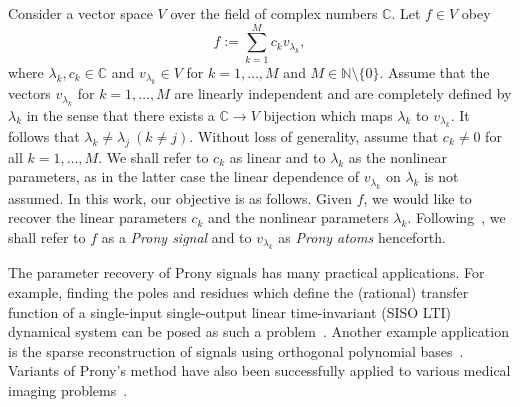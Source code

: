 \documentclass{arxiv}
\begin{document}
Consider a vector space $V$ over the field of complex numbers $\mathbb{C}$. Let $f \in V$ obey
\begin{equation}
    \label{eq:PronySig}
    f := \sum_{k=1}^M c_k v_{\lambda_k},
\end{equation}
where $\lambda_k, c_k \in \mathbb{C}$ and  $v_{\lambda_k} \in V$ for $k=1,\ldots,M$ and $M \in \mathbb{N} \setminus \{0\}$. Assume that the vectors $v_{\lambda_k}$ for $k=1,\ldots,M$ are linearly independent and are completely defined by $\lambda_k$ in the sense that there exists a $\mathbb{C} \to V$  bijection which maps $\lambda_k$ to $v_{\lambda_k}$. It follows that $\lambda_k \neq \lambda_j \ (k \neq j)$. Without loss of generality, assume that $c_k \neq 0$ for all $k=1,\ldots,M$. We shall refer to $c_k$ as linear and to $\lambda_k$ as the nonlinear parameters, as in the latter case the linear dependence of $v_{\lambda_k}$ on $\lambda_k$ is not assumed. In this work, our objective is as follows. Given $f$, we would like to recover the linear parameters $c_k$ and the nonlinear parameters $\lambda_k$. Following~\cite{peter2013generalized, peter2013generalizedDissertation, stampfer2019generalized, stampfer2020generalized}, we shall refer to $f$ as a \emph{Prony signal} and to  $v_{\lambda_k}$ as \emph{Prony atoms} henceforth.

The parameter recovery of Prony signals has many practical applications. For example, finding the poles and residues which define the (rational) transfer function of a single-input single-output linear time-invariant (SISO LTI) dynamical system can be posed as such a problem~\cite{dozsa2025system}. Another example application is the sparse reconstruction of signals using orthogonal polynomial bases~\cite{stampfer2020generalized}. Variants of Prony's method have also been successfully applied to various medical imaging problems~\cite{jaramillo2014improving, jani2023prony}.
\end{document}

